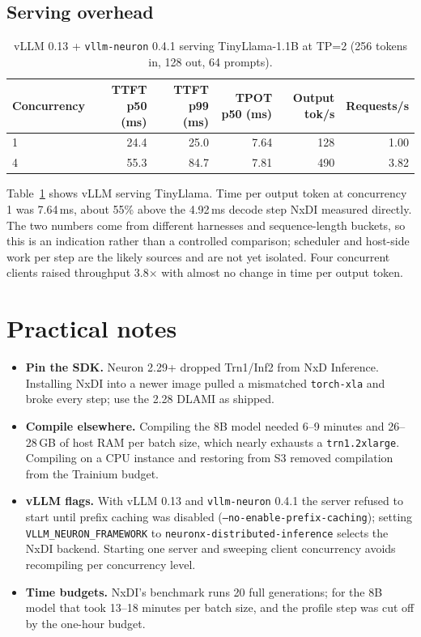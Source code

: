 \documentclass[11pt]{article}
\begin{document}
\subsection{Serving overhead}
\begin{table}[t]
\centering
\small
\begin{tabular}{lrrrrr}
\toprule
Concurrency & TTFT p50 (ms) & TTFT p99 (ms) & TPOT p50 (ms) & Output tok/s & Requests/s \\
\midrule
1 & 24.4 & 25.0 & 7.64 & 128 & 1.00 \\
4 & 55.3 & 84.7 & 7.81 & 490 & 3.82 \\
\bottomrule
\end{tabular}
\caption{vLLM 0.13 + \texttt{vllm-neuron} 0.4.1 serving TinyLlama-1.1B at TP=2 (256 tokens in, 128 out, 64 prompts).}
\label{tab:vllm}
\end{table}
Table~\ref{tab:vllm} shows vLLM serving TinyLlama. Time per output token at concurrency 1 was 7.64\,ms, about 55\% above the
4.92\,ms decode step NxDI measured directly. The two numbers come from different harnesses and sequence-length buckets, so this is
an indication rather than a controlled comparison; scheduler and host-side work per step are the likely sources and are not yet
isolated. Four concurrent clients raised throughput 3.8$\times$ with almost no change in time per output token.

\section{Practical notes}
\begin{itemize}
\item \textbf{Pin the SDK.} Neuron 2.29+ dropped Trn1/Inf2 from NxD Inference. Installing NxDI into a newer image pulled a
mismatched \texttt{torch-xla} and broke every step; use the 2.28 DLAMI as shipped.
\item \textbf{Compile elsewhere.} Compiling the 8B model needed 6--9 minutes and 26--28\,GB of host RAM per batch size, which
nearly exhausts a \texttt{trn1.2xlarge}. Compiling on a CPU instance and restoring from S3 removed compilation from the Trainium
budget.
\item \textbf{vLLM flags.} With vLLM 0.13 and \texttt{vllm-neuron} 0.4.1 the server refused to start until prefix caching was
disabled (\texttt{--no-enable-prefix-caching}); setting \texttt{VLLM\_NEURON\_FRAMEWORK} to
\texttt{neuronx-distributed-inference} selects the NxDI backend. Starting one server and sweeping client concurrency avoids recompiling per concurrency level.
\item \textbf{Time budgets.} NxDI's benchmark runs 20 full generations; for the 8B model that took 13--18 minutes per batch size,
and the profile step was cut off by the one-hour budget.
\end{itemize}
\end{document}
